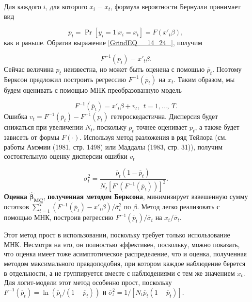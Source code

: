 Для каждого $i$,  для которого $x_i=x_t$,  формула вероятности Бернулли принимает вид  

\begin{equation} 
\label{GrindEQ__14_24_} 
p_t= \Pr[y_i = 1| x_i = x_t] = F(x'_t\beta),  
\end{equation} 
как и раньше. Обратив выражение \eqref{GrindEQ__14_24_},  получим

\[
F^{-1}(p_t) = x'_t\beta.
\] 
Сейчас величина $p_t$ неизвестна,  но может быть оценена с помощью $\overline{p}_t$. Поэтому Берксон предложил построить регрессию $F^{-1}(\overline{p}_t)$ на $x_t$. Таким образом,  мы будем оценивать с помощью МНК преобразованную модель  

\begin{equation} 
\label{GrindEQ__14_25_} 
F^{-1}(\overline{p}_t)  = x'_t\beta + v_t, \ \ t=1, \dots,  \ T. 
\end{equation} 
Ошибка $v_t = F^{-1}(\overline{p}_t) - F^{-1}(p_t)$ гетероскедастична.  Дисперсия будет снижаться при увеличении $N_t$,  поскольку ${\overline{p}}_t$ точнее оценивает $p_t$,  а также будет зависеть от формы $F(\cdot )$. Используя метод разложения в ряд Тейлора (см. работы Амэмии (1981,  стр. 1498) или Маддалы (1983,  стр. 31)),  получим состоятельную оценку дисперсии ошибки $v_t$ 

\begin{equation} 
\label{GrindEQ__14_26_} 
\overline{\sigma}^2_t = \frac{\overline{p}_t (1 - \overline{p}_t) }{N_t [F'(F^{-1}(\overline{p}_t))]^2}. 
\end{equation} 
\textbf{Оценка} $\widehat{\mathbf{\beta}}_{\mathbf{MC}}$, \textbf{полученная методом Берксона}, минимизирует взвешенную сумму остатков $\sum^T_{t=1} (F^{-1} (\overline{p}_t) - x'_t\beta) / \overline{\sigma}^2_t$ по $\beta$. Метод легко реализовать с помощью МНК,  построив регрессию $F^{-1}(\overline{p}_t)/
\overline{\sigma}_t$ на $x_t/\overline{\sigma}_t.$

Этот метод прост в использовании,  поскольку требует только использование МНК. Несмотря на это,  он полностью эффективен,  поскольку,  можно показать,  что оценка имеет тоже асимптотическое распределение,  что и оценка,  полученная методом максимального правдоподобия,  при котором каждое наблюдение берется в отдельности,  а не группируется вместе с наблюдениями с тем же значением $x_t$. Для логит-модели этот метод особенно прост,  поскольку $F^{-1}(\overline{p}_t) = \ln (\overline{p}_t / (1 - \overline{p}_t))$ и $\overline{\sigma}^2_t = 1/[N_t \overline{p}_t (1 - \overline{p}_t)].$

